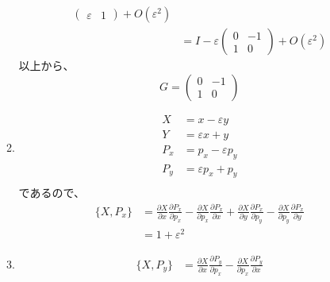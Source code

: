 \documentclass{jsarticle}
\begin{document}
\begin{enumerate}
\begin{enumerate}
$$\begin{aligned}
\begin{pmatrix}
                                         \varepsilon & 1
                                       \end{pmatrix} + O(\varepsilon^2)                 \\
                                   & = I - \varepsilon \begin{pmatrix}
                                                         0 & - 1 \\
                                                         1 & 0
                                                       \end{pmatrix} + O(\varepsilon^2)
                  \end{aligned}
                $$
                以上から、
                $$
                  G =
                  \begin{pmatrix}
                    0 & -1 \\
                    1 & 0
                  \end{pmatrix}
                $$
          \item
                $$
                  \begin{aligned}
                    X   & = x - \varepsilon y      \\
                    Y   & = \varepsilon x  + y     \\
                    P_x & = p_x - \varepsilon p_y  \\
                    P_y & = \varepsilon p_x  + p_y \\
                  \end{aligned}
                $$
                であるので、
                $$
                  \begin{aligned}
                    \{X, P_x\} & = \frac{\partial X}{\partial x}\frac{\partial P_x}{\partial p_x}
                    - \frac{\partial X}{\partial p_x}\frac{\partial P_x}{\partial x}
                    +\frac{\partial X}{\partial y}\frac{\partial P_x}{\partial p_y}
                    - \frac{\partial X}{\partial p_y}\frac{\partial P_x}{\partial y}              \\
                               & = 1 + \varepsilon^2
                  \end{aligned}
                $$
          \item
                $$
                  \begin{aligned}
                    \{X, P_y\} & = \frac{\partial X}{\partial x}\frac{\partial P_y}{\partial p_x}
                    - \frac{\partial X}{\partial p_x}\frac{\partial P_y}{\partial x}

\end{aligned}$$
\end{enumerate}
\end{enumerate}
\end{document}
